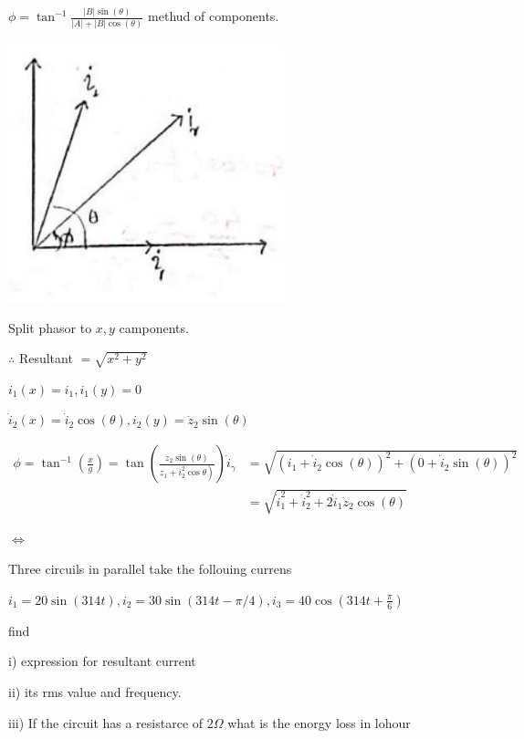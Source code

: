 \documentclass[12pt, a4paper]{article}
\newcommand{\figwidth}{8cm}
\begin{document}
$\phi=\tan ^{-1} \frac{|B| \sin (\theta)}{|A|+|B| \cos (\theta)}$ methud of components.

	\begin{center}
		\includegraphics[max width=\figwidth]{2024_06_15_74bbabba7981675b0d49g-03}
	\end{center}

	Split phasor to $x, y$ camponents.

$\therefore$ Resultant $=\sqrt{x^{2}+y^{2}}$

$i_{1}(x)=i_{1}, i_{1}(y)=0$

$\dot{i}_{2}(x)=\dot{i}_{2} \cos (\theta), i_{2}(y)=\dot{z}_{2} \sin (\theta)$

$\begin{aligned} \phi=\tan ^{-1}\left(\frac{x}{g}\right)=\tan \left(\frac{\dot{z}_{2} \sin (\theta)}{\left.z_{1}+i_{2}^{2} \cos \theta\right)}\right) \dot{i}_{\gamma} & =\sqrt{\left(i_{1}+\dot{i}_{2} \cos (\theta)\right)^{2}+\left(0+\dot{i}_{2} \sin (\theta)\right)^{2}} \\ & =\sqrt{\dot{i}_{1}^{2}+\dot{i}_{2}^{2}+2 \dot{i}_{1} \dot{z}_{2} \cos (\theta)}\end{aligned}$

$\Leftrightarrow$

	Three circuils in parallel take the follouing currens

$i_{1}=20 \sin (314 t), i_{2}=30 \sin (314 t-\pi / 4), i_{3}=40 \cos \left(314 t+\frac{\pi}{6}\right)$

	find

	i) expression for resultant current

	ii) its rms value and frequency.

	iii) If the circuit has a resistarce of $2 \Omega$ what is the enorgy loss in lohour
\end{document}
